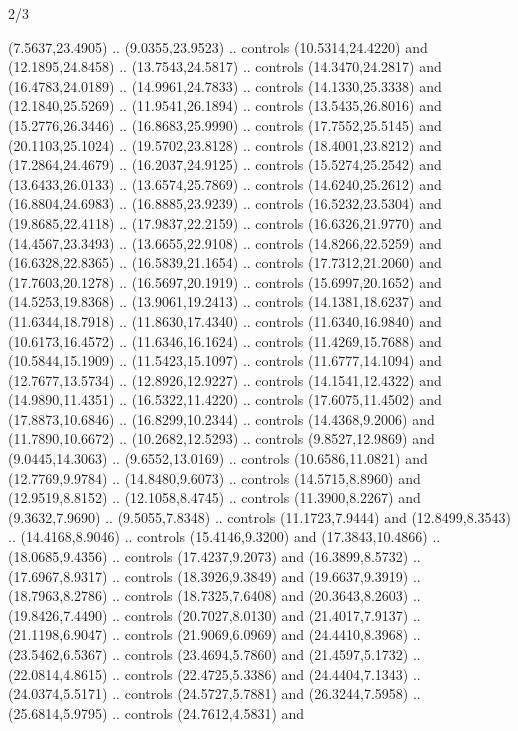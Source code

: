 \begin{flagdescription}{2/3}
\begin{scope}[yshift=\flagwidth,scale=\flagwidth/1241.93737]
\begin{scope}[y=-1mm, x=1mm,draw=gold,fill=blue,line join=miter,miter limit=4,line width=1.8\lw]
\begin{scope}[y=1mm, x=1mm, yscale=-1,shift={(573.68mm+\str,145.75)}]
\begin{scope}[scale=1.35,shift={(-9,-3)}]
\begin{scope}[scale=0.55]
\begin{scope}[scale=1.333]
    (7.5637,23.4905) .. (9.0355,23.9523) .. controls (10.5314,24.4220) and
    (12.1895,24.8458) .. (13.7543,24.5817) .. controls (14.3470,24.2817) and
    (16.4783,24.0189) .. (14.9961,24.7833) .. controls (14.1330,25.3338) and
    (12.1840,25.5269) .. (11.9541,26.1894) .. controls (13.5435,26.8016) and
    (15.2776,26.3446) .. (16.8683,25.9990) .. controls (17.7552,25.5145) and
    (20.1103,25.1024) .. (19.5702,23.8128) .. controls (18.4001,23.8212) and
    (17.2864,24.4679) .. (16.2037,24.9125) .. controls (15.5274,25.2542) and
    (13.6433,26.0133) .. (13.6574,25.7869) .. controls (14.6240,25.2612) and
    (16.8804,24.6983) .. (16.8885,23.9239) .. controls (16.5232,23.5304) and
    (19.8685,22.4118) .. (17.9837,22.2159) .. controls (16.6326,21.9770) and
    (14.4567,23.3493) .. (13.6655,22.9108) .. controls (14.8266,22.5259) and
    (16.6328,22.8365) .. (16.5839,21.1654) .. controls (17.7312,21.2060) and
    (17.7603,20.1278) .. (16.5697,20.1919) .. controls (15.6997,20.1652) and
    (14.5253,19.8368) .. (13.9061,19.2413) .. controls (14.1381,18.6237) and
    (11.6344,18.7918) .. (11.8630,17.4340) .. controls (11.6340,16.9840) and
    (10.6173,16.4572) .. (11.6346,16.1624) .. controls (11.4269,15.7688) and
    (10.5844,15.1909) .. (11.5423,15.1097) .. controls (11.6777,14.1094) and
    (12.7677,13.5734) .. (12.8926,12.9227) .. controls (14.1541,12.4322) and
    (14.9890,11.4351) .. (16.5322,11.4220) .. controls (17.6075,11.4502) and
    (17.8873,10.6846) .. (16.8299,10.2344) .. controls (14.4368,9.2006) and
    (11.7890,10.6672) .. (10.2682,12.5293) .. controls (9.8527,12.9869) and
    (9.0445,14.3063) .. (9.6552,13.0169) .. controls (10.6586,11.0821) and
    (12.7769,9.9784) .. (14.8480,9.6073) .. controls (14.5715,8.8960) and
    (12.9519,8.8152) .. (12.1058,8.4745) .. controls (11.3900,8.2267) and
    (9.3632,7.9690) .. (9.5055,7.8348) .. controls (11.1723,7.9444) and
    (12.8499,8.3543) .. (14.4168,8.9046) .. controls (15.4146,9.3200) and
    (17.3843,10.4866) .. (18.0685,9.4356) .. controls (17.4237,9.2073) and
    (16.3899,8.5732) .. (17.6967,8.9317) .. controls (18.3926,9.3849) and
    (19.6637,9.3919) .. (18.7963,8.2786) .. controls (18.7325,7.6408) and
    (20.3643,8.2603) .. (19.8426,7.4490) .. controls (20.7027,8.0130) and
    (21.4017,7.9137) .. (21.1198,6.9047) .. controls (21.9069,6.0969) and
    (24.4410,8.3968) .. (23.5462,6.5367) .. controls (23.4694,5.7860) and
    (21.4597,5.1732) .. (22.0814,4.8615) .. controls (22.4725,5.3386) and
    (24.4404,7.1343) .. (24.0374,5.5171) .. controls (24.5727,5.7881) and
    (26.3244,7.5958) .. (25.6814,5.9795) .. controls (24.7612,4.5831) and

\end{scope}
\end{scope}
\end{scope}
\end{scope}
\end{scope}
\end{scope}
\end{flagdescription}
